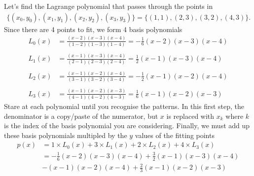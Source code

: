 \exemple{\upline}
{
	Let's find the Lagrange polynomial that passes through the points in 
	\begin{align*}
	\{(x_0,y_0),(x_1,y_1),(x_2,y_2),(x_3,y_3)\}=\{(1,1),(2,3),(3,2),(4,3)\}.
	\end{align*}
	Since there are 4 points to fit, we form 4 basis polynomials
	\begin{align*}
	L_0(x) &= \frac{(x-2)(x-3)(x-4)}{(1-2)(1-3)(1-4)}  = -\frac{1}{6}(x-2)(x-3)(x-4) \\ \\
	L_1(x) &= \frac{(x-1)(x-3)(x-4)}{(2-1)(2-3)(2-4)}  =  \frac{1}{2}(x-1)(x-3)(x-4) \\ \\
	L_2(x) &= \frac{(x-1)(x-2)(x-4)}{(3-1)(3-2)(3-4)}  = -\frac{1}{2}(x-1)(x-2)(x-4) \\ \\
	L_3(x) &= \frac{(x-1)(x-2)(x-3)}{(4-1)(4-2)(4-3)}  =  \frac{1}{6}(x-1)(x-2)(x-3)
	\end{align*} 
	Stare at each polynomial until you recognise the patterns. In this first step, the denominator is a copy/paste of the numerator, but $x$ is replaced with $x_k$ where $k$ is the index of the basis polynomial you are considering. Finally, we must add up these basis polynomials multipled by the $y$ values of the fitting points
	\begin{align*}
	p(x) &= 1\times L_0(x) + 3\times L_1(x) + 2\times L_2(x) + 4\times L_3(x)  \\
	 &= -\frac{1}{6}(x-2)(x-3)(x-4) + \frac{3}{2}(x-1)(x-3)(x-4) \\
		& - (x-1)(x-2)(x-4) + \frac{2}{3}(x-1)(x-2)(x-3)
	\end{align*}
}{\downline}






